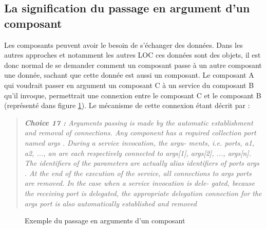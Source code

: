   
  \label{sec:argumentscomposants}
  
  \subsection{La signification du passage en argument d'un composant}
  
  Les composants peuvent avoir le besoin de s'échanger des données. Dans les autres approches et notamment les autres LOC ces données sont des objets, il est donc normal de se demander comment un composant passe à un autre composant une donnée, sachant que cette donnée est aussi un composant. Le composant A qui voudrait passer en argument un composant C à un service du composant B qu'il invoque, permettrait une connexion entre le composant C et le composant B (représenté dans figure \ref{fig:archiCompo}). Le mécanisme de cette connexion étant décrit par \cite{Spacek:2014:CMA:2602458.2602476} : 
  
  \begin{quote}
      \emph{\textbf{Choice 17 : }Arguments passing is made by the automatic establishment and removal of connections.
Any component has a required collection port named args . During a service invocation, the argu-
ments, i.e. ports, {a1, a2, ..., an} are each respectively connected to {args[1], args[2], ..., args[n]}. The
identifiers of the parameters are actually alias identifiers of ports args . At the end of the execution of
the service, all connections to args ports are removed. In the case when a service invocation is dele-
gated, because the receiving port is delegated, the appropriate delegation connection for the args port
is also automatically established and removed} 
  \end{quote}
  
\begin{figure}[!t]
\centering
{}
\caption{Exemple du passage en arguments d'un composant}
\label{fig:archiCompo}
\end{figure}
  
